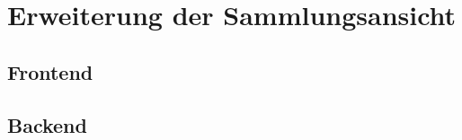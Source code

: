 \section{Erweiterung der Sammlungsansicht}\label{sec:erweiterung-der-sammlungsansicht}

\subsection{Frontend}

\subsection{Backend}